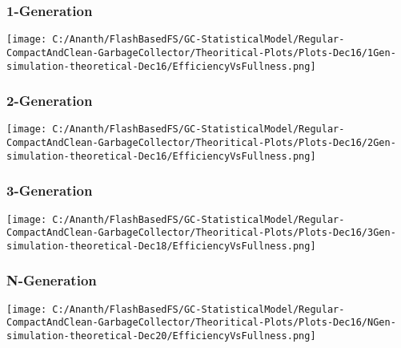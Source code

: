 \subsubsection{1-Generation}
\begin{SCfigure}
	\texttt{[image: C:/Ananth/FlashBasedFS/GC-StatisticalModel/Regular-CompactAndClean-GarbageCollector/Theoritical-Plots/Plots-Dec16/1Gen-simulation-theoretical-Dec16/EfficiencyVsFullness.png]}
\end{SCfigure}

\subsubsection{2-Generation}
\begin{SCfigure}
	\texttt{[image: C:/Ananth/FlashBasedFS/GC-StatisticalModel/Regular-CompactAndClean-GarbageCollector/Theoritical-Plots/Plots-Dec16/2Gen-simulation-theoretical-Dec16/EfficiencyVsFullness.png]}
\end{SCfigure}

\subsubsection{3-Generation}
\begin{SCfigure}
	\texttt{[image: C:/Ananth/FlashBasedFS/GC-StatisticalModel/Regular-CompactAndClean-GarbageCollector/Theoritical-Plots/Plots-Dec16/3Gen-simulation-theoretical-Dec18/EfficiencyVsFullness.png]}
\end{SCfigure}

\subsubsection{N-Generation}
\begin{SCfigure}
	\texttt{[image: C:/Ananth/FlashBasedFS/GC-StatisticalModel/Regular-CompactAndClean-GarbageCollector/Theoritical-Plots/Plots-Dec16/NGen-simulation-theoretical-Dec20/EfficiencyVsFullness.png]}
\end{SCfigure}





